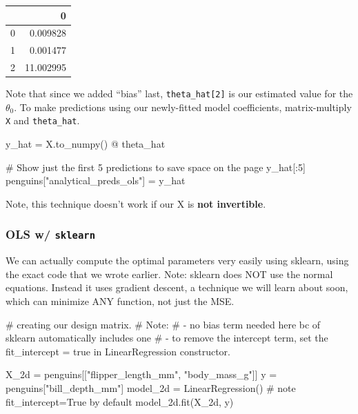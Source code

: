 \documentclass[
  letterpaper,
  DIV=11,
  numbers=noendperiod]{scrreprt}
\newenvironment{Shaded}{\begin{snugshade}}{\end{snugshade}}
\newcommand{\CommentTok}[1]{\textcolor[rgb]{0.37,0.37,0.37}{#1}}
\newcommand{\DecValTok}[1]{\textcolor[rgb]{0.68,0.00,0.00}{#1}}
\newcommand{\NormalTok}[1]{\textcolor[rgb]{0.00,0.23,0.31}{#1}}
\newcommand{\OperatorTok}[1]{\textcolor[rgb]{0.37,0.37,0.37}{#1}}
\newcommand{\StringTok}[1]{\textcolor[rgb]{0.13,0.47,0.30}{#1}}
\begin{document}
\begin{tabular}{lr}
\toprule
{} &          0 \\
\midrule
0 &   0.009828 \\
1 &   0.001477 \\
2 &  11.002995 \\
\bottomrule
\end{tabular}

Note that since we added ``bias'' last, \texttt{theta\_hat{[}2{]}} is
our estimated value for the \(\theta_0\). To make predictions using our
newly-fitted model coefficients, matrix-multiply \texttt{X} and
\texttt{theta\_hat}.

\begin{Shaded}
\begin{Highlighting}[]
\NormalTok{y\_hat }\OperatorTok{=}\NormalTok{ X.to\_numpy() }\OperatorTok{@}\NormalTok{ theta\_hat}

\CommentTok{\# Show just the first 5 predictions to save space on the page}
\NormalTok{y\_hat[:}\DecValTok{5}\NormalTok{]}
\NormalTok{penguins[}\StringTok{"analytical\_preds\_ols"}\NormalTok{] }\OperatorTok{=}\NormalTok{ y\_hat}
\end{Highlighting}
\end{Shaded}

Note, this technique doesn't work if our X is \textbf{not invertible}.

\hypertarget{ols-w-sklearn}{%
\subsubsection{\texorpdfstring{OLS w/
\texttt{sklearn}}{OLS w/ sklearn}}\label{ols-w-sklearn}}

We can actually compute the optimal parameters very easily using
sklearn, using the exact code that we wrote earlier. Note: sklearn does
NOT use the normal equations. Instead it uses gradient descent, a
technique we will learn about soon, which can minimize ANY function, not
just the MSE.

\begin{Shaded}
\begin{Highlighting}[]
\CommentTok{\# creating our design matrix.}
\CommentTok{\# Note:}
\CommentTok{\#  {-} no bias term needed here bc of sklearn automatically includes one}
\CommentTok{\#  {-} to remove the intercept term, set the fit\_intercept = true in LinearRegression constructor.}

\NormalTok{X\_2d }\OperatorTok{=}\NormalTok{ penguins[[}\StringTok{"flipper\_length\_mm"}\NormalTok{, }\StringTok{"body\_mass\_g"}\NormalTok{]]}
\NormalTok{y }\OperatorTok{=}\NormalTok{ penguins[}\StringTok{"bill\_depth\_mm"}\NormalTok{]}
\NormalTok{model\_2d }\OperatorTok{=}\NormalTok{ LinearRegression() }\CommentTok{\# note fit\_intercept=True by default}
\NormalTok{model\_2d.fit(X\_2d, y)}
\end{Highlighting}
\end{Shaded}
\end{document}

